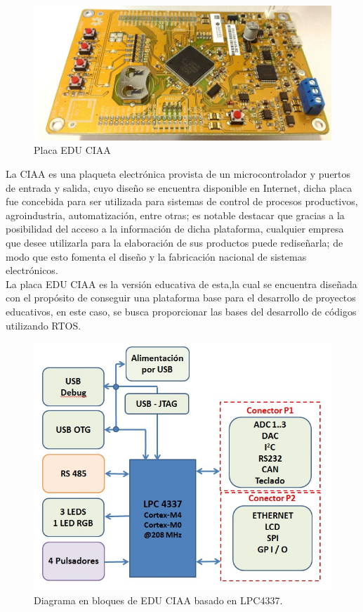 \documentclass[12pt,letterpaper]{article}
\begin{document}
\begin{center}
\begin{figure}[!h]
\centering
\includegraphics[width=15 cm]{figuras/descripcion1.png}
\caption{Placa EDU CIAA}
\label{Fig_placa}
\end{figure}
\end{center}

La CIAA es una plaqueta electrónica provista de un microcontrolador y puertos de entrada y salida, cuyo diseño se encuentra disponible en Internet, dicha placa fue concebida para ser utilizada para sistemas de control de procesos productivos, agroindustria, automatización, entre otras; es notable destacar que gracias a la posibilidad del acceso a la información de dicha plataforma, cualquier empresa que desee utilizarla para la elaboración de sus productos puede rediseñarla; de modo que esto fomenta el diseño y la fabricación nacional de sistemas electrónicos.\\


La placa EDU CIAA es la versión educativa de esta,la cual se encuentra diseñada con el propósito de conseguir una plataforma base para el desarrollo de proyectos educativos, en este caso, se busca proporcionar las bases del desarrollo de códigos utilizando RTOS.\\

\begin{center}
\begin{figure}[!h]
\centering
\includegraphics[width=8 cm]{figuras/diagramaenbloques.jpg}
\caption{Diagrama en bloques de EDU CIAA basado en LPC4337.}
\label{Fig1}
\end{figure}

\end{center}
\end{document}
